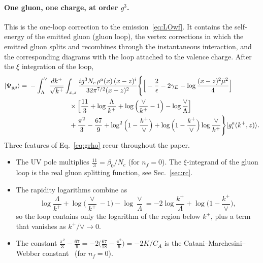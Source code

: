 \documentclass[aps,prd,onecolumn,superscriptaddress,nofootinbib,floatfix,longbibliography,11pt]{revtex4-2}
\numberwithin{equation}{section}
\begin{document}
\paragraph*{One gluon, one charge, at order $g^3$.} This is the one-loop correction to the emission~\eqref{eq:LOwf}. It contains the self-energy of the emitted gluon (gluon loop), the vertex corrections in which the emitted gluon splits and recombines through the instantaneous interaction, and the corresponding diagrams with the loop attached to the valence charge. After the $\xi$ integration of the loop,
\begin{align}
|\Psi_{g\rho}\rangle={}&-\int_{\Lambda}^{\vee}\frac{dk^+}{\sqrt{k^+}}\int_{x,z}\frac{ig^3N_c\,\rho^a(x)\,(x-z)^i}{32\pi^{7/2}(x-z)^2}\Bigg\{\Big[-\frac2\epsilon-2\gamma_E-\log\frac{(x-z)^2\bar\mu^2}{4}\Big]\notag\\
&\hspace{6em}\times\Big[\frac{11}{3}+\log\frac{\Lambda}{k^+}+\log\Big(\frac{\vee}{k^+}-1\Big)-\log\frac{\vee}{\Lambda}\Big]\notag\\
&\hspace{6em}+\frac{\pi^2}{3}-\frac{67}{9}+\log^2\Big(1-\frac{k^+}{\vee}\Big)+\log\Big(1-\frac{k^+}{\vee}\Big)\log\frac{\vee}{k^+}\Bigg\}|g^a_i(k^+,z)\rangle .
\label{eq:grho}
\end{align}
Three features of Eq.~\eqref{eq:grho} recur throughout the paper.
\begin{itemize}
\item The UV pole multiplies $\frac{11}{3}=\beta_0/N_c$ (for $n_f=0$). The $\xi$-integrand of the gluon loop is the real gluon splitting function, see Sec.~\ref{sec:rc}.
\item The rapidity logarithms combine as
\begin{equation}
\log\frac{\Lambda}{k^+}+\log\Big(\frac{\vee}{k^+}-1\Big)-\log\frac{\vee}{\Lambda}=-2\log\frac{k^+}{\Lambda}+\log\Big(1-\frac{k^+}{\vee}\Big),
\label{eq:grhologs}
\end{equation}
so the loop contains only the logarithm of the region below $k^+$, plus a term that vanishes as $k^+/\vee\to0$.
\item The constant $\frac{\pi^2}{3}-\frac{67}{9}=-2\big(\frac{67}{18}-\frac{\pi^2}{6}\big)=-2K/C_A$ is the Catani--Marchesini--Webber constant~\cite{Catani:1990rr} (for $n_f=0$).
\end{itemize}
\end{document}
